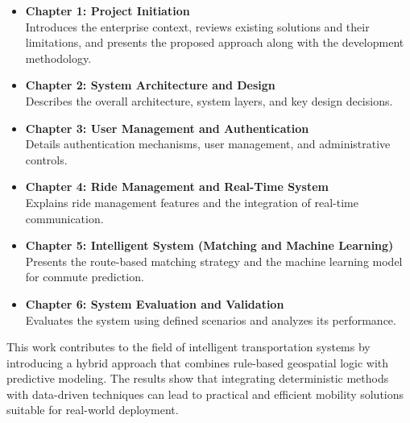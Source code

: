 \begin{itemize}
\item \textbf{Chapter 1: Project Initiation} \\ 
Introduces the enterprise context, reviews existing solutions and their limitations, and presents the proposed approach along with the development methodology.

\item \textbf{Chapter 2: System Architecture and Design} \\ 
Describes the overall architecture, system layers, and key design decisions.

\item \textbf{Chapter 3: User Management and Authentication} \\ 
Details authentication mechanisms, user management, and administrative controls.

\item \textbf{Chapter 4: Ride Management and Real-Time System} \\ 
Explains ride management features and the integration of real-time communication.

\item \textbf{Chapter 5: Intelligent System (Matching and Machine Learning)} \\ 
Presents the route-based matching strategy and the machine learning model for commute prediction.

\item \textbf{Chapter 6: System Evaluation and Validation} \\ 
Evaluates the system using defined scenarios and analyzes its performance.
\end{itemize}

This work contributes to the field of intelligent transportation systems by introducing a hybrid approach that combines rule-based geospatial logic with predictive modeling. The results show that integrating deterministic methods with data-driven techniques can lead to practical and efficient mobility solutions suitable for real-world deployment.